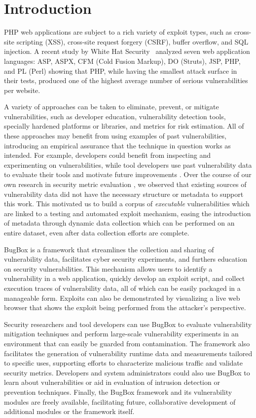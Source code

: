 \documentclass[letterpaper,twocolumn,10pt]{article}
\begin{document}
\section{Introduction}
PHP web applications are subject to a rich variety of exploit types, such as cross-site scripting (XSS), cross-site request forgery (CSRF), buffer overflow, and SQL injection.  A recent study by White Hat Security~\cite{WhiteHat:2010:Online} analyzed seven web application languages: ASP, ASPX, CFM (Cold Fusion Markup), DO (Struts), JSP, PHP, and PL (Perl) showing that PHP, while having the smallest attack surface in their tests, produced one of the highest average number of serious vulnerabilities per website.

A variety of approaches can be taken to eliminate, prevent, or mitigate vulnerabilities, such as developer education, vulnerability detection tools, specially hardened platforms or libraries, and metrics for risk estimation. All of these approaches may benefit from using examples of past vulnerabilities, introducing an empirical assurance that the technique in question works as intended. For example, developers could benefit from inspecting and experimenting on vulnerabilities, while tool developers use past vulnerability data to evaluate their tools and motivate future improvements \cite{miningbugfinding}. Over the course of our own research in security metric evaluation \cite{metrisec2012surface}, we observed that existing sources of vulnerability data did not have the necessary structure or metadata to support this work. This motivated us to build a corpus of \textit{executable} vulnerabilities which are linked to a testing and automated exploit mechanism, easing the introduction of metadata through dynamic data collection which can be performed on an entire dataset, even after data collection efforts are complete.

BugBox is a framework that streamlines the collection and sharing of vulnerability data, facilitates cyber security experiments, and furthers education on security vulnerabilities.  This mechanism allows users to identify a vulnerability in a web application, quickly develop an exploit script, and collect execution traces of vulnerability data, all of which can be easily packaged in a manageable form. Exploits can also be demonstrated by visualizing a live web browser that shows the exploit being performed from the attacker's perspective.

Security researchers and tool developers can use BugBox to evaluate vulnerability mitigation techniques and perform large-scale vulnerability experiments in an environment that can easily be guarded from contamination. The framework also facilitates the generation of vulnerability runtime data and measurements tailored to specific uses, supporting efforts to characterize malicious traffic and validate security metrics. Developers and system administrators could also use BugBox to learn about vulnerabilities or aid in evaluation of intrusion detection or prevention techniques. Finally, the BugBox framework and its vulnerability modules are freely available, facilitating future, collaborative development of additional modules or the framework itself.
\end{document}

